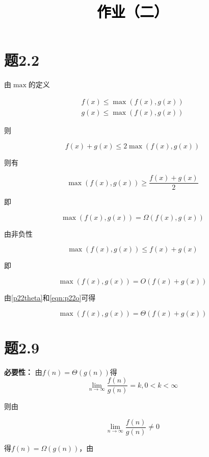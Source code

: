 \documentclass[a4paper,twoside]{article}
\newcommand{\PaperTitle}{作业（二）}  %
\begin{document}
\newpage

\title{
	\Large{\textcolor{black}{\PaperTitle}}
}
	
	
\maketitle
	
\tableofcontents
 
\newpage
\begin{spacing}{1.2}
	

\section{题2.2}
由$\max$的定义

\begin{align*}
	f(x) \le \max (f(x),g(x)) \\
	g(x) \le \max (f(x),g(x)) 
\end{align*}

则

$$
f(x)+g(x) \le 2 \max (f(x),g(x))
$$

则有

$$
\max (f(x),g(x)) \ge \frac{f(x)+g(x)}{2}
$$

即

\begin{equation}
	\max (f(x),g(x)) = \Omega (f(x),g(x)) \label{p22theta}
\end{equation}

由非负性

$$
\max (f(x),g(x)) \le f(x)+g(x) 
$$

即

\begin{equation}
	\max (f(x),g(x)) = O (f(x)+g(x)) \label{eqn:p22o}
\end{equation}

由\eqref{p22theta}和\eqref{eqn:p22o}可得


$$
\max (f(x),g(x)) = \Theta (f(x)+g(x)) \label{eqn:p22o}
$$

\section{题2.9}

\textbf{必要性：} 
由$f(n)=\Theta(g(n))$得
$$
\lim_{n \to \infty}\frac{f(n)}{g(n)}=k, 0<k<\infty
$$

则由

$$
\lim_{n \to \infty}\frac{f(n)}{g(n)} \ne 0
$$

得$f(n)=\Omega(g(n))$，由


\end{spacing}
\end{document}
